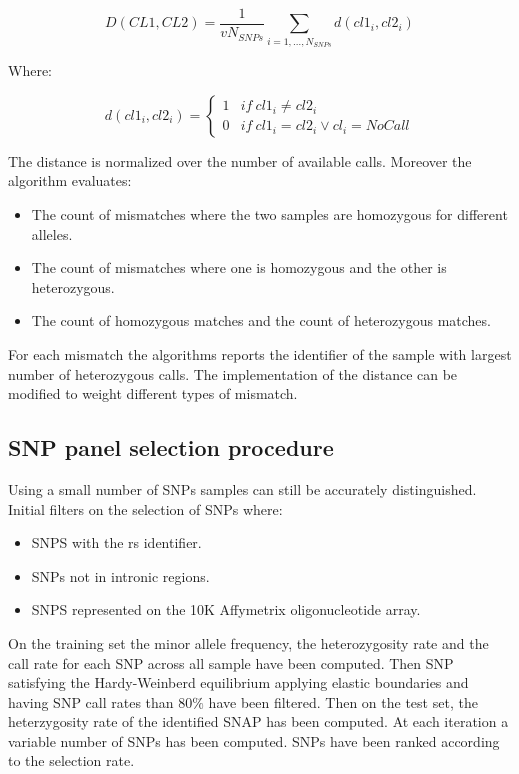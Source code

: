 	$$D(CL1, CL2) = \frac{1}{vN_{SNPs}}\sum\limits_{i=1, \dots, N_{SNPs}}d(cl1_i, cl2_i)$$

	Where:

	$$d(cl1_i, cl2_i) = \begin{cases} 1 &if\ cl1_i\neq cl2_i\\ 0 &if\ cl1_i = cl2_i\lor cl_i = NoCall\end{cases}$$

	The distance is normalized over the number of available calls.
	Moreover the algorithm evaluates:

	\begin{multicols}{2}
		\begin{itemize}
			\item The count of mismatches where the two samples are homozygous for different alleles.
			\item The count of mismatches where one is homozygous and the other is heterozygous.
			\item The count of homozygous matches and the count of heterozygous matches.
		\end{itemize}
	\end{multicols}

	For each mismatch the algorithms reports the identifier of the sample with largest number of heterozygous calls.
	The implementation of the distance can be modified to weight different types of mismatch.

	\subsection{SNP panel selection procedure}
	Using a small number of SNPs samples can still be accurately distinguished.
	Initial filters on the selection of SNPs where:

	\begin{multicols}{2}
		\begin{itemize}
			\item SNPS with the rs identifier.
			\item SNPs not in intronic regions.
			\item SNPS represented on the 10K Affymetrix oligonucleotide array.
		\end{itemize}
	\end{multicols}

	On the training set the minor allele frequency, the heterozygosity rate and the call rate for each SNP across all sample have been computed.
	Then SNP satisfying the Hardy-Weinberd equilibrium applying elastic boundaries and having SNP call rates than $80\%$ have been filtered.
	Then on the test set, the heterzygosity rate of the identified SNAP has been computed.
	At each iteration a variable number of SNPs has been computed.
	SNPs have been ranked according to the selection rate.


